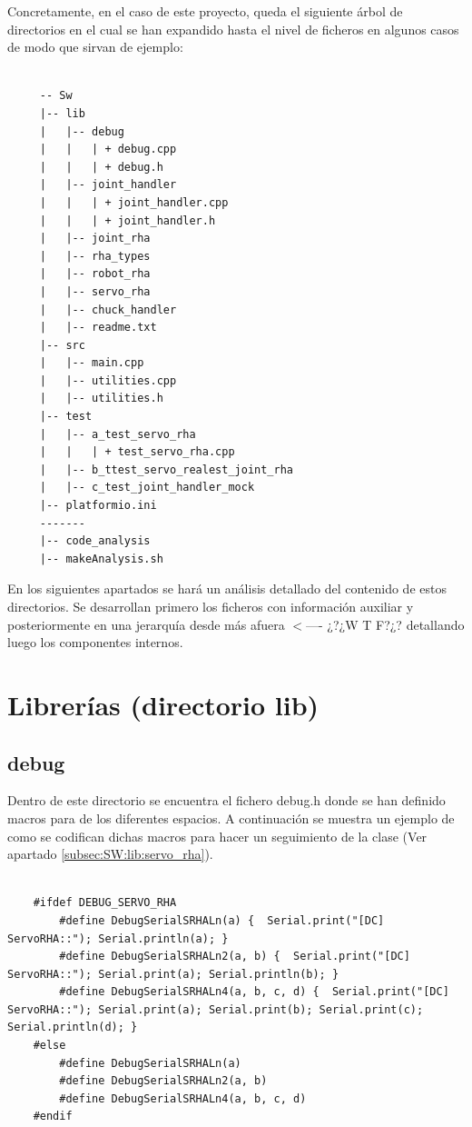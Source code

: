     Concretamente, en el caso de este proyecto, queda el siguiente árbol de directorios en el cual se han expandido hasta el nivel de ficheros en algunos casos de modo que sirvan de ejemplo:

    \lstset{language=C, breaklines=true, basicstyle=\footnotesize}
        \begin{lstlisting}[frame=single]
        
     -- Sw
     |-- lib
     |   |-- debug
     |   |   | + debug.cpp
     |   |   | + debug.h
     |   |-- joint_handler
     |   |   | + joint_handler.cpp
     |   |   | + joint_handler.h
     |   |-- joint_rha
     |   |-- rha_types
     |   |-- robot_rha
     |   |-- servo_rha
     |   |-- chuck_handler
     |   |-- readme.txt
     |-- src  
     |   |-- main.cpp
     |   |-- utilities.cpp
     |   |-- utilities.h
     |-- test
     |   |-- a_test_servo_rha
     |   |   | + test_servo_rha.cpp
     |   |-- b_ttest_servo_realest_joint_rha
     |   |-- c_test_joint_handler_mock
     |-- platformio.ini
     -------
     |-- code_analysis
     |-- makeAnalysis.sh
        \end{lstlisting}
    
    En los siguientes apartados se hará un análisis detallado del contenido de estos directorios. Se desarrollan primero los ficheros con información auxiliar y posteriormente en una jerarquía desde más afuera \textcolor{pRojo}{$<$---- ¿?¿W T F?¿?} detallando luego los componentes internos.
\section{Librerías (directorio lib)} \label{sec:SW:lib}

    \subsection{debug} \label{subsec:SW:lib:debug}
        Dentro de este directorio se encuentra el fichero debug.h donde se han definido macros para  de los diferentes espacios. A continuación se muestra un ejemplo de como se codifican dichas macros para hacer un seguimiento de la clase  (Ver apartado \ref{subsec:SW:lib:servo_rha}).
        
        \lstset{language=C, breaklines=true, basicstyle=\footnotesize}
        \begin{lstlisting}[frame=single]
        
    #ifdef DEBUG_SERVO_RHA
        #define DebugSerialSRHALn(a) {  Serial.print("[DC]  ServoRHA::"); Serial.println(a); }
        #define DebugSerialSRHALn2(a, b) {  Serial.print("[DC]  ServoRHA::"); Serial.print(a); Serial.println(b); }
        #define DebugSerialSRHALn4(a, b, c, d) {  Serial.print("[DC]  ServoRHA::"); Serial.print(a); Serial.print(b); Serial.print(c); Serial.println(d); }
    #else
        #define DebugSerialSRHALn(a)
        #define DebugSerialSRHALn2(a, b)
        #define DebugSerialSRHALn4(a, b, c, d)
    #endif
            
        \end{lstlisting}

